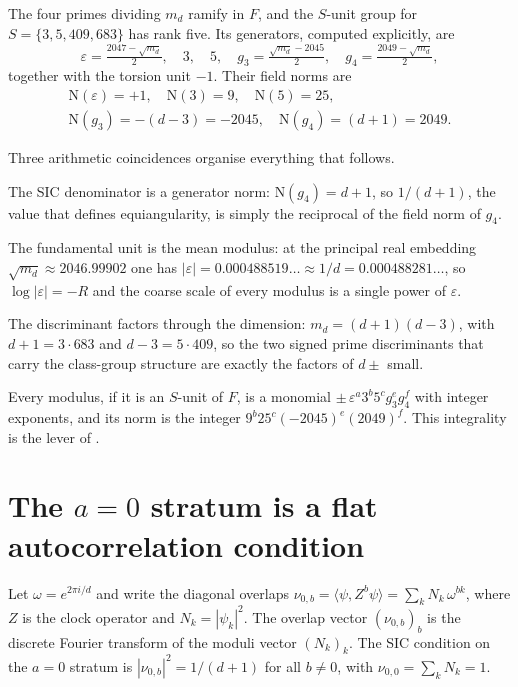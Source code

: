 \documentclass[12pt,a4paper]{article}
\newcommand{\Fd}{F}
\newcommand{\md}{m_d}
\newcommand{\Norm}{\mathrm{N}}
\begin{document}
The four primes dividing $\md$ ramify in $\Fd$, and the $S$-unit group for
$S = \{3,5,409,683\}$ has rank five.  Its generators, computed explicitly, are
\[
\varepsilon = \tfrac{2047 - \sqrt{\md}}{2},\quad
3,\quad 5,\quad
g_3 = \tfrac{\sqrt{\md}-2045}{2},\quad
g_4 = \tfrac{2049-\sqrt{\md}}{2},
\]
together with the torsion unit $-1$.  Their field norms are
\[
\begin{gathered}
\Norm(\varepsilon)=+1,\quad
\Norm(3)=9,\quad
\Norm(5)=25,\\
\Norm(g_3)=-(d-3)=-2045,\quad
\Norm(g_4)=(d+1)=2049 .
\end{gathered}
\]

Three arithmetic coincidences organise everything that follows.

The SIC denominator is a generator norm: $\Norm(g_4)=d+1$, so $1/(d+1)$, the
value that defines equiangularity, is simply the reciprocal of the field norm
of $g_4$.

The fundamental unit is the mean modulus: at the principal real embedding
$\sqrt{\md}\approx 2046.99902$ one has
$|\varepsilon| = 0.000488519\ldots \approx 1/d = 0.000488281\ldots$, so
$\log|\varepsilon| = -R$ and the coarse scale of every modulus is a single power
of $\varepsilon$.

The discriminant factors through the dimension: $\md = (d+1)(d-3)$, with
$d+1=3\cdot 683$ and $d-3 = 5\cdot 409$, so the two signed prime discriminants
that carry the class-group structure are exactly the factors of $d\pm$ small.

Every modulus, if it is an $S$-unit of $\Fd$, is a monomial
$\pm\,\varepsilon^{a}3^{b}5^{c}g_3^{e}g_4^{f}$ with integer exponents, and its
norm is the integer $9^{b}25^{c}(-2045)^{e}(2049)^{f}$.  This integrality is the
lever of .

\section{The $a=0$ stratum is a flat autocorrelation condition}
\label{sec:autocorr}

Let $\omega = e^{2\pi i/d}$ and write the diagonal overlaps
$\nu_{0,b} = \langle \psi, Z^b \psi\rangle = \sum_k N_k\,\omega^{bk}$, where
$Z$ is the clock operator and $N_k=|\psi_k|^2$.  The overlap vector
$(\nu_{0,b})_b$ is the discrete Fourier transform of the moduli vector
$(N_k)_k$.  The SIC condition on the $a=0$ stratum is
$|\nu_{0,b}|^2 = 1/(d+1)$ for all $b\neq 0$, with $\nu_{0,0}=\sum_k N_k = 1$.
\end{document}
